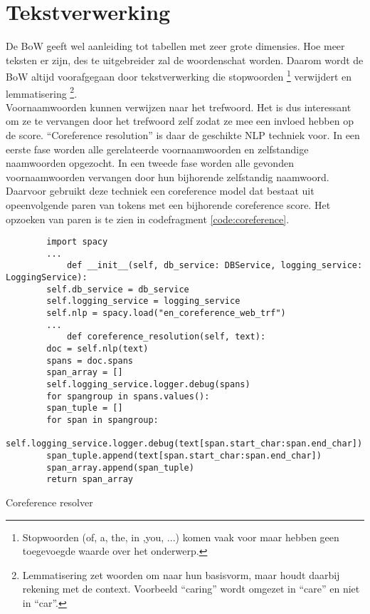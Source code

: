 \section{Tekstverwerking}
De BoW geeft wel aanleiding tot tabellen met zeer grote dimensies. Hoe meer teksten er zijn, des te uitgebreider zal de woordenschat worden. Daarom wordt de BoW altijd voorafgegaan door tekstverwerking die stopwoorden \footnote{Stopwoorden (of, a, the, in ,you, ...) komen vaak voor maar hebben geen toegevoegde waarde over het onderwerp.} verwijdert en lemmatisering \footnote{Lemmatisering zet woorden om naar hun basisvorm, maar houdt daarbij rekening met de context. Voorbeeld ``caring'' wordt omgezet in ``care'' en niet in ``car''.}.\\
Voornaamwoorden kunnen verwijzen naar het trefwoord. Het is dus interessant om ze te vervangen door het trefwoord zelf zodat ze mee een invloed hebben op de score. ``Coreference resolution'' is daar de geschikte NLP techniek voor. In een eerste fase worden alle gerelateerde voornaamwoorden en zelfstandige naamwoorden opgezocht. In een tweede fase worden alle gevonden voornaamwoorden vervangen door hun bijhorende zelfstandig naamwoord. Daarvoor gebruikt deze techniek een coreference model dat bestaat uit opeenvolgende paren van tokens met een bijhorende coreference score.
Het opzoeken van paren is te zien in codefragment \ref{code:coreference}.
\begin{listing}
    \begin{verbatim}
        import spacy
        ...
            def __init__(self, db_service: DBService, logging_service: LoggingService):
        self.db_service = db_service
        self.logging_service = logging_service
        self.nlp = spacy.load("en_coreference_web_trf")
        ...
            def coreference_resolution(self, text):
        doc = self.nlp(text)
        spans = doc.spans
        span_array = []
        self.logging_service.logger.debug(spans)
        for spangroup in spans.values():
        span_tuple = []
        for span in spangroup:
        self.logging_service.logger.debug(text[span.start_char:span.end_char])
        span_tuple.append(text[span.start_char:span.end_char])
        span_array.append(span_tuple)
        return span_array
    \end{verbatim}
    \caption[Coreference resolver]{Coreference resolver}
    \label{code:coreference}
\end{listing}
